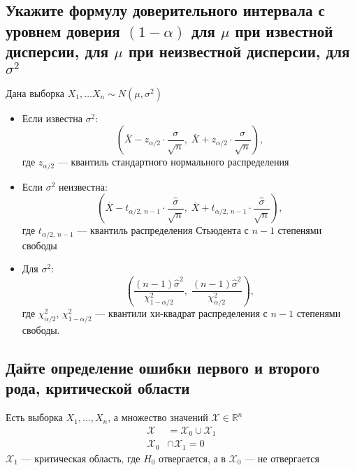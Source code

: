 \documentclass{article}
\begin{document}
\subsection{Укажите формулу доверительного интервала с уровнем доверия $(1-\alpha)$ для $\mu$ при известной дисперсии, для $\mu$ при неизвестной дисперсии, для $\sigma^{2}$}
Дана выборка $X_{1}, \ldots X_{n} \sim N\left(\mu, \sigma^{2}\right)$
\begin{itemize}
    \item Если известна $\sigma^{2}$:
    \begin{equation*}
        \left( \overline{X} - z_{\alpha/2} \cdot \frac{\sigma}{\sqrt{n}},\; \overline{X} + z_{\alpha/2} \cdot \frac{\sigma}{\sqrt{n}} \right),
    \end{equation*}
    где $z_{\alpha/2}$ — квантиль стандартного нормального распределения
    \item Если $\sigma^2$ неизвестна:
    \begin{equation*}
        \left( \overline{X} - t_{\alpha/2,\,n-1} \cdot \frac{\hat{\sigma}}{\sqrt{n}},\; \overline{X} + t_{\alpha/2,\,n-1} \cdot \frac{\hat{\sigma}}{\sqrt{n}} \right),
    \end{equation*}
    где $t_{\alpha/2,\,n-1}$ — квантиль распределения Стьюдента с $n - 1$ степенями свободы
    \item Для $\sigma^2$:
    \begin{equation*}
        \left( \frac{(n - 1)\hat{\sigma}^2}{\chi^2_{1 - \alpha/2}},\; \frac{(n - 1)\hat{\sigma}^2}{\chi^2_{\alpha/2}} \right),
    \end{equation*}
    где $\chi^2_{\alpha/2}$, $\chi^2_{1 - \alpha/2}$ — квантили хи-квадрат распределения с $n - 1$ степенями свободы.
\end{itemize}

\subsection{Дайте определение ошибки первого и второго рода, критической области}
 Есть выборка $X_1,\ldots,X_n$, а множество значений $\mathcal{X}\in\mathbb{R}^n$
\begin{equation*}
    \begin{aligned}
        \mathcal{X}&=\mathcal{X}_0\cup\mathcal{X}_1\\
        \mathcal{X}_0&\cap\mathcal{X}_1=0
    \end{aligned}
\end{equation*}
$\mathcal{X}_1$ — критическая область, где $H_0$ отвергается, а в $\mathcal{X}_0$ — не отвергается
\end{document}
